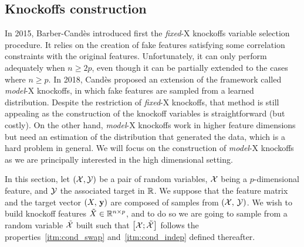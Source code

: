 \subsection{Knockoffs construction}\label{subsec:kc}

In 2015, Barber-Candès introduced first the \textit{fixed}-X knockoffs variable selection procedure.
It relies on the creation of fake features satisfying some correlation constraints with the original features.
Unfortunately, it can only perform adequately when $n \geq 2p$,
even though it can be partially extended to the cases where $n \geq p$.
In 2018, Candès proposed an extension of the framework called \textit{model}-X knockoffs,
in which fake features are sampled from a learned distribution.
Despite the restriction of \textit{fixed}-X knockoffs, that method is still appealing as the construction of the
knockoff variables is straightforward (but costly).
On the other hand, \textit{model}-X knockoffs work in higher feature dimensions
but need an estimation of the distribution that generated the data,
which is a hard problem in general.
We will focus on the construction of \textit{model}-X knockoffs as we are principally interested in the
high dimensional setting.

In this section, let $(\mathcal{X}, \mathcal{Y})$ be a pair of random variables,
$\mathcal{X}$ being a $p$-dimensional feature,
and $\mathcal{Y}$ the associated target in $\mathbb{R}$.
We suppose that the feature matrix and the target vector $(X,\, \mathbf{y})$ are composed of samples from $(\mathcal{X},\, \mathcal{Y})$.
We wish to build knockoff features $\tilde{X} \in \mathbb{R}^{n \times p}$, and to do so we are going to sample from a
random variable $\tilde{\mathcal{X}}$ built such that $\big[ \mathcal{X}; \tilde{\mathcal{X}} \big]$
follows the properties~\ref{itm:cond_swap} and~\ref{itm:cond_indep} defined thereafter.

